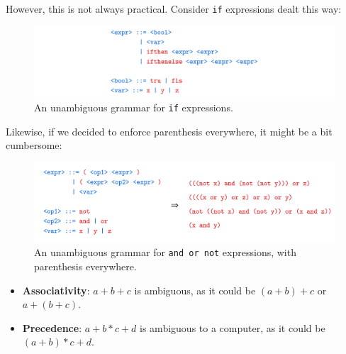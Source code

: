 \noindent
However, this is not always practical. Consider \texttt{if} expressions dealt this way:
\begin{figure}[h]
    \centering
    \includegraphics[width=1\textwidth]{Sections/Formal/amb3.png}
    \caption{An unambiguous grammar for \texttt{if} expressions.}
    \label{fig:amb3}
\end{figure}

\noindent
Likewise, if we decided to enforce parenthesis everywhere, it might be a bit cumbersome:
\begin{figure}[h]
    \centering
    \includegraphics[width=1\textwidth]{Sections/Formal/amb4.png}
    \caption{An unambiguous grammar for \texttt{and or not} expressions, with parenthesis everywhere.}
    \label{fig:amb4}
\end{figure}

\noindent
\begin{theo}
    
    \begin{itemize}
        \item \textbf{Associativity}: $a + b + c$ is ambiguous, as it could be $(a + b) + c$ or $a + (b + c)$.
        \item \textbf{Precedence}: $a + b * c + d$ is ambiguous to a computer, as it could be $(a + b) * c + d$.
    \end{itemize}
    \end{theo}
\newpage 

